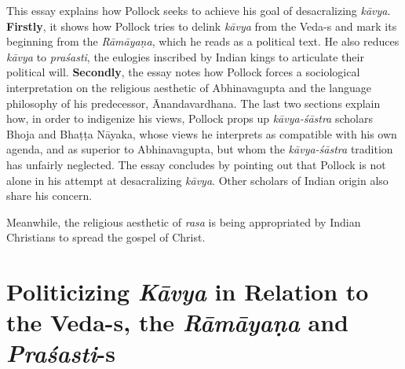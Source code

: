 This essay explains how Pollock seeks to achieve his goal of desacralizing \textsl{kāvya}. \textbf{Firstly}, it shows how Pollock tries to delink \textsl{kāvya} from the Veda-s and mark its beginning from the \textsl{Rāmāyaṇa}, which he reads as a political text. He also reduces \textsl{kāvya} to \textsl{praśasti}, the eulogies inscribed by Indian kings to articulate their political will. \textbf{Secondly}, the essay notes how Pollock forces a sociological interpretation on the religious aesthetic of Abhinavagupta and the language philosophy of his predecessor, Ānandavardhana. The last two sections explain how, in order to indigenize his views, Pollock props up \textsl{kāvya-śāstra} scholars Bhoja and Bhaṭṭa Nāyaka, whose views he interprets as compatible with his own agenda, and as superior to Abhinavagupta, but whom the \textsl{kāvya-śāstra} tradition has unfairly neglected. The essay concludes by pointing out that Pollock is not alone in his attempt at desacralizing \textsl{kāvya}. Other scholars of Indian origin also share his concern. 

Meanwhile, the religious aesthetic of \textsl{rasa} is being appropriated by Indian Christians to spread the gospel of Christ.\\[-21pt]

\section*{Politicizing {\sl\bfseries Kāvya} in Relation to the Veda-s, the {\sl\bfseries Rāmāyaṇa} and {\sl\bfseries Praśasti}-s}

